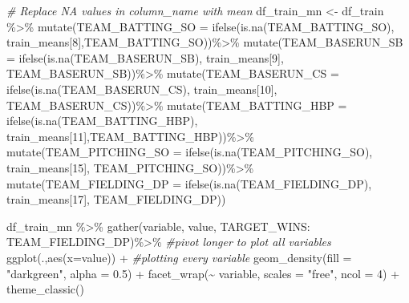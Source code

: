 \documentclass[
]{article}
\newenvironment{Shaded}{\begin{snugshade}}{\end{snugshade}}
\newcommand{\AttributeTok}[1]{\textcolor[rgb]{0.77,0.63,0.00}{#1}}
\newcommand{\CommentTok}[1]{\textcolor[rgb]{0.56,0.35,0.01}{\textit{#1}}}
\newcommand{\DecValTok}[1]{\textcolor[rgb]{0.00,0.00,0.81}{#1}}
\newcommand{\FloatTok}[1]{\textcolor[rgb]{0.00,0.00,0.81}{#1}}
\newcommand{\FunctionTok}[1]{\textcolor[rgb]{0.00,0.00,0.00}{#1}}
\newcommand{\NormalTok}[1]{#1}
\newcommand{\OtherTok}[1]{\textcolor[rgb]{0.56,0.35,0.01}{#1}}
\newcommand{\SpecialCharTok}[1]{\textcolor[rgb]{0.00,0.00,0.00}{#1}}
\newcommand{\StringTok}[1]{\textcolor[rgb]{0.31,0.60,0.02}{#1}}
\begin{document}
\begin{Shaded}
\begin{Highlighting}[]
\CommentTok{\# Replace NA values in \textquotesingle{}column\_name\textquotesingle{} with \textquotesingle{}mean\textquotesingle{}}
\NormalTok{df\_train\_mn }\OtherTok{\textless{}{-}}\NormalTok{ df\_train }\SpecialCharTok{\%\textgreater{}\%}
  \FunctionTok{mutate}\NormalTok{(}\AttributeTok{TEAM\_BATTING\_SO =}
           \FunctionTok{ifelse}\NormalTok{(}\FunctionTok{is.na}\NormalTok{(TEAM\_BATTING\_SO),}
\NormalTok{                  train\_means[}\DecValTok{8}\NormalTok{],TEAM\_BATTING\_SO))}\SpecialCharTok{\%\textgreater{}\%} 
  \FunctionTok{mutate}\NormalTok{(}\AttributeTok{TEAM\_BASERUN\_SB =} 
           \FunctionTok{ifelse}\NormalTok{(}\FunctionTok{is.na}\NormalTok{(TEAM\_BASERUN\_SB),}
\NormalTok{                  train\_means[}\DecValTok{9}\NormalTok{], TEAM\_BASERUN\_SB))}\SpecialCharTok{\%\textgreater{}\%}
  \FunctionTok{mutate}\NormalTok{(}\AttributeTok{TEAM\_BASERUN\_CS =}
           \FunctionTok{ifelse}\NormalTok{(}\FunctionTok{is.na}\NormalTok{(TEAM\_BASERUN\_CS),}
\NormalTok{                  train\_means[}\DecValTok{10}\NormalTok{], TEAM\_BASERUN\_CS))}\SpecialCharTok{\%\textgreater{}\%}
  \FunctionTok{mutate}\NormalTok{(}\AttributeTok{TEAM\_BATTING\_HBP =} 
           \FunctionTok{ifelse}\NormalTok{(}\FunctionTok{is.na}\NormalTok{(TEAM\_BATTING\_HBP),}
\NormalTok{                  train\_means[}\DecValTok{11}\NormalTok{],TEAM\_BATTING\_HBP))}\SpecialCharTok{\%\textgreater{}\%}
  \FunctionTok{mutate}\NormalTok{(}\AttributeTok{TEAM\_PITCHING\_SO =}
           \FunctionTok{ifelse}\NormalTok{(}\FunctionTok{is.na}\NormalTok{(TEAM\_PITCHING\_SO),}
\NormalTok{                  train\_means[}\DecValTok{15}\NormalTok{], TEAM\_PITCHING\_SO))}\SpecialCharTok{\%\textgreater{}\%}
  \FunctionTok{mutate}\NormalTok{(}\AttributeTok{TEAM\_FIELDING\_DP =}
           \FunctionTok{ifelse}\NormalTok{(}\FunctionTok{is.na}\NormalTok{(TEAM\_FIELDING\_DP),}
\NormalTok{                  train\_means[}\DecValTok{17}\NormalTok{], TEAM\_FIELDING\_DP))}
\end{Highlighting}
\end{Shaded}

\begin{Shaded}
\begin{Highlighting}[]
\NormalTok{df\_train\_mn }\SpecialCharTok{\%\textgreater{}\%} 
  \FunctionTok{gather}\NormalTok{(variable, value, TARGET\_WINS}\SpecialCharTok{:}\NormalTok{ TEAM\_FIELDING\_DP)}\SpecialCharTok{\%\textgreater{}\%} \CommentTok{\#pivot longer to plot all variables}
  \FunctionTok{ggplot}\NormalTok{(.,}\FunctionTok{aes}\NormalTok{(}\AttributeTok{x=}\NormalTok{value)) }\SpecialCharTok{+} \CommentTok{\#plotting every variable}
  \FunctionTok{geom\_density}\NormalTok{(}\AttributeTok{fill =} \StringTok{"darkgreen"}\NormalTok{, }\AttributeTok{alpha =} \FloatTok{0.5}\NormalTok{) }\SpecialCharTok{+}
  \FunctionTok{facet\_wrap}\NormalTok{(}\SpecialCharTok{\textasciitilde{}}\NormalTok{ variable, }\AttributeTok{scales =} \StringTok{"free"}\NormalTok{, }\AttributeTok{ncol =} \DecValTok{4}\NormalTok{) }\SpecialCharTok{+}
  \FunctionTok{theme\_classic}\NormalTok{()}
\end{Highlighting}
\end{Shaded}
\end{document}
